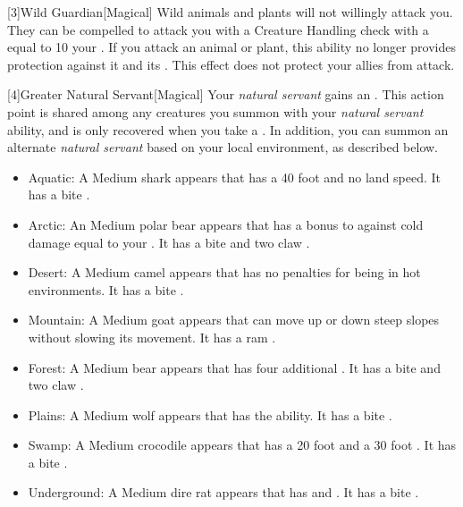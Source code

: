         [3]{Wild Guardian}[Magical] Wild animals and plants will not willingly attack you.
        They can be compelled to attack you with a Creature Handling check with a  equal to 10 \add your .
        If you attack an animal or plant, this ability no longer provides protection against it and its .
        This effect does not protect your allies from attack.

        [4]{Greater Natural Servant}[Magical] Your \textit{natural servant} gains an .
        This action point is shared among any creatures you summon with your \textit{natural servant} ability, and is only recovered when you take a .
        In addition, you can summon an alternate \textit{natural servant} based on your local environment, as described below.
        \begin{itemize}
            \item Aquatic: A Medium shark appears that has a 40 foot  and no land speed.
                It has a bite .
            \item Arctic: An Medium polar bear appears that has a bonus to  against cold damage equal to your .
                It has a bite  and two claw .
            \item Desert: A Medium camel appears that has no penalties for being in hot environments.
                It has a bite .
            \item Mountain: A Medium goat appears that can move up or down steep slopes without slowing its movement.
                It has a ram .
            \item Forest: A Medium bear appears that has four additional .
                It has a bite  and two claw .
            \item Plains: A Medium wolf appears that has the  ability.
                It has a bite .
            \item Swamp: A Medium crocodile appears that has a 20 foot  and a 30 foot .
                It has a bite .
            \item Underground: A Medium dire rat appears that has  and .
                It has a bite .
        \end{itemize}

